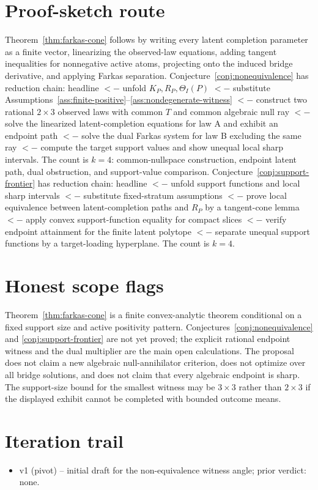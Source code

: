 \documentclass[11pt]{article}
\theoremstyle{definition}
\theoremstyle{plain}
\theoremstyle{remark}
\begin{document}
\section{Proof-sketch route}
Theorem~\ref{thm:farkas-cone} follows by writing every latent completion parameter as a finite vector, linearizing the observed-law equations, adding tangent inequalities for nonnegative active atoms, projecting onto the induced bridge derivative, and applying Farkas separation. Conjecture~\ref{conj:nonequivalence} has reduction chain: headline \(<-\) unfold \(K_P,R_P,\Theta_I(P)\) \(<-\) substitute Assumptions~\ref{ass:finite-positive}--\ref{ass:nondegenerate-witness} \(<-\) construct two rational \(2\times3\) observed laws with common \(T\) and common algebraic null ray \(<-\) solve the linearized latent-completion equations for law A and exhibit an endpoint path \(<-\) solve the dual Farkas system for law B excluding the same ray \(<-\) compute the target support values and show unequal local sharp intervals. The count is \(k=4\): common-nullspace construction, endpoint latent path, dual obstruction, and support-value comparison. Conjecture~\ref{conj:support-frontier} has reduction chain: headline \(<-\) unfold support functions and local sharp intervals \(<-\) substitute fixed-stratum assumptions \(<-\) prove local equivalence between latent-completion paths and \(R_P\) by a tangent-cone lemma \(<-\) apply convex support-function equality for compact slices \(<-\) verify endpoint attainment for the finite latent polytope \(<-\) separate unequal support functions by a target-loading hyperplane. The count is \(k=4\).

\section{Honest scope flags}
Theorem~\ref{thm:farkas-cone} is a finite convex-analytic theorem conditional on a fixed support size and active positivity pattern. Conjectures~\ref{conj:nonequivalence} and \ref{conj:support-frontier} are not yet proved; the explicit rational endpoint witness and the dual multiplier are the main open calculations. The proposal does not claim a new algebraic null-annihilator criterion, does not optimize over all bridge solutions, and does not claim that every algebraic endpoint is sharp. The support-size bound for the smallest witness may be \(3\times3\) rather than \(2\times3\) if the displayed exhibit cannot be completed with bounded outcome means.

\section{Iteration trail}
\begin{itemize}[leftmargin=*]
\item v1 (pivot) -- initial draft for the non-equivalence witness angle; prior verdict: none.
\end{itemize}
\end{document}
